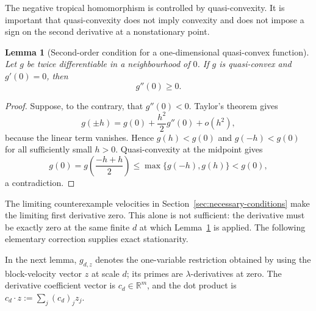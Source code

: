 \documentclass[aps,pra,11pt,onecolumn,nofootinbib,tightenlines]{revtex4-2}
\newtheorem{lemma}[theorem]{Lemma}
\theoremstyle{definition}
\begin{document}
The negative tropical homomorphism is controlled by quasi-convexity.  It is important that quasi-convexity does not imply convexity and does not impose a sign on the second derivative at a nonstationary point.

\begin{lemma}[Second-order condition for a one-dimensional quasi-convex function]
\label{lem:app-quasiconvex-stationary}
Let $g$ be twice differentiable in a neighbourhood of $0$.  If $g$ is quasi-convex and $g'(0)=0$, then
\begin{equation}
 g''(0)\geq0.
 \label{eq:app-quasiconvex-second-condition}
\end{equation}
\end{lemma}

\begin{proof}
Suppose, to the contrary, that $g''(0)<0$.  Taylor's theorem gives
\begin{equation}
 g(\pm h)=g(0)+\frac{h^2}{2}g''(0)+o(h^2),
 \label{eq:app-quasiconvex-Taylor}
\end{equation}
because the linear term vanishes.  Hence $g(h)<g(0)$ and $g(-h)<g(0)$ for all sufficiently small $h>0$.  Quasi-convexity at the midpoint gives
\begin{equation}
 g(0)=g\left(\frac{-h+h}{2}\right)
 \leq\max\{g(-h),g(h)\}<g(0),
 \label{eq:app-quasiconvex-contradiction}
\end{equation}
a contradiction.
\end{proof}

The limiting counterexample velocities in Section~\ref{sec:necessary-conditions} make the limiting first derivative zero. This alone is not sufficient: the derivative must be exactly zero at the same finite $d$ at which Lemma~\ref{lem:app-quasiconvex-stationary} is applied. The following elementary correction supplies exact stationarity.

In the next lemma, $g_{d,z}$ denotes the one-variable restriction obtained by
using the block-velocity vector $z$ at scale $d$; its primes are
$\lambda$-derivatives at zero.  The derivative coefficient vector is
$c_d\in\mathbb R^m$, and the dot product is
$c_d\mathbin{\cdot}z:=\sum_j(c_d)_jz_j$.
\end{document}
